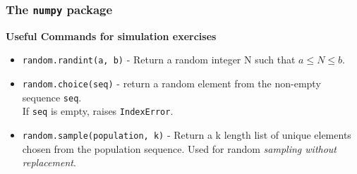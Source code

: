 \documentclass[MASTER.tex]{subfiles}
\begin{document}
\begin{frame}
\frametitle{The \texttt{numpy} package}
\Large	
\textbf{Useful Commands for simulation exercises}
\begin{itemize}
\item \texttt{random.randint(a, b)} - Return a random integer N such that $a \leq N \leq b$.

\item \texttt{random.choice(seq)} - return a random element from the non-empty sequence \texttt{seq}. \\ If \texttt{seq} is empty, raises \texttt{IndexError}.

\item \texttt{random.sample(population, k)} - 
Return a k length list of unique elements chosen from the population sequence. Used for random \textit{sampling without replacement}.
\end{itemize}
\end{frame}
%
%
%
%	
\end{document}

